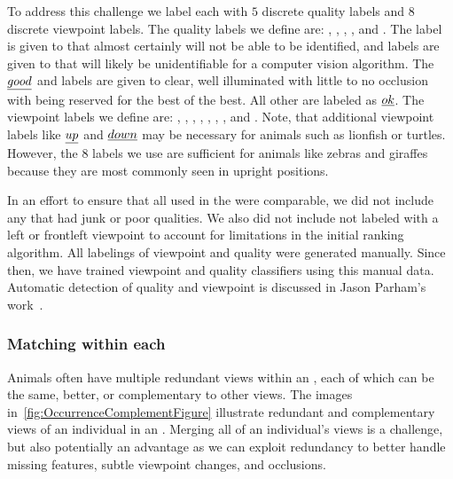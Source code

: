             To address this challenge we label each \annot{} with $5$ discrete quality labels and $8$ discrete viewpoint
            labels. The quality labels we define are: \qualJunk{}, \qualPoor{}, \qualOk{}, \qualGood{}, and
            \qualExcellent{}. The \qualJunk{} label is given to \annots{} that almost certainly will not be able to be
            identified, and \qualPoor{} labels are given to \annots{} that will likely be unidentifiable for a computer
            vision algorithm. The $\emph{good}{}$ and \qualExcellent{} labels are given to clear, well illuminated
            \annots{} with little to no occlusion with \qualExcellent{} being reserved for the best of the best. All
            other \annots{} are labeled as $\emph{ok}$. The viewpoint labels we define are: \vpFront{}, \vpFrontLeft{},
            \vpLeft{}, \vpBackLeft{}, \vpBack{}, \vpBackRight{}, \vpBack{}, and \vpFrontRight{}. Note, that additional
            viewpoint labels like $\emph{up}{}$ and $\emph{down}{}$ may be necessary for animals such as lionfish or turtles.
            However, the $8$ labels we use are sufficient for animals like zebras and giraffes because they are most
            commonly seen in upright positions.

            In an effort to ensure that all \annots{} used in the \GZC{} were comparable, we did not include any
            \annot{} that had junk or poor qualities. We also did not include \annots{} not labeled with a left or
            frontleft viewpoint to account for limitations in the initial ranking algorithm. All labelings of
            viewpoint and quality were generated manually. Since then, we have trained viewpoint and quality
            classifiers using this manual data. Automatic detection of quality and viewpoint is discussed in Jason
            Parham's work~\cite{parham_photographic_2015}.

        \subsubsection{Matching within each \occurrence{}} %
            Animals often have multiple redundant views within an \occurrence{}, each of which can be the same,
            better, or complementary to other views. The images in~\cref{fig:OccurrenceComplementFigure} illustrate
            redundant and complementary views of an individual in an \occurrence{}. Merging all of an individual's
            views is a challenge, but also potentially an advantage as we can exploit redundancy to better handle
            missing features, subtle viewpoint changes, and occlusions.

